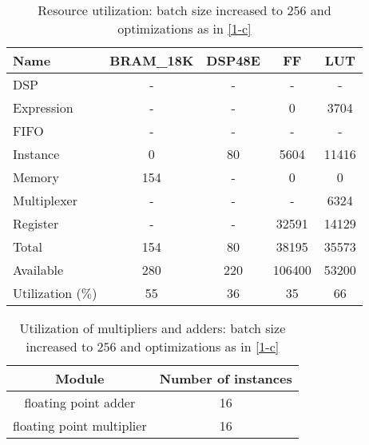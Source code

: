 \documentclass{article}
\begin{document}
	\begin{table}[H]
		\centering
		\begin{tabular}{lcccc}
			Name      & BRAM\_18K& DSP48E&   FF   &  LUT  \\
			\hline
			DSP              &        -&      -&       -&      -\\
			Expression       &        -&      -&       0&   3704\\
			FIFO             &        -&      -&       -&      -\\
			Instance         &        0&     80&    5604&  11416\\
			Memory           &      154&      -&       0&      0\\
			Multiplexer      &        -&      -&       -&   6324\\
			Register         &        -&      -&   32591&  14129\\
			\hline
			Total            &      154&     80&   38195&  35573\\
			Available        &      280&    220&  106400&  53200\\
			\hline
			Utilization ($\%$)  &       55&     36&      35&     66
		\end{tabular}
		\caption{Resource utilization: batch size increased to $256$ and optimizations as in \ref{1-c}}
		\label{1-d-resources}
	\end{table}

	\begin{table}[H]
		\centering
		\begin{tabular}{cc}
			Module & Number of instances \\
			\hline
			floating point adder & 16 \\
			floating point multiplier & 16
		\end{tabular}
		\caption{Utilization of multipliers and adders:  batch size increased to $256$ and optimizations as in \ref{1-c}}
		\label{1-d-resources-arithmetic}
	\end{table}
\end{document}
